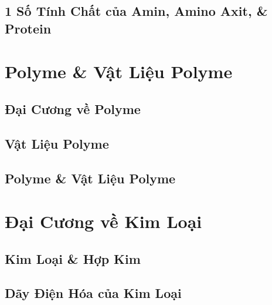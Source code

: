 \documentclass{article}
\numberwithin{equation}{section}
\begin{document}

\subsection{1 Số Tính Chất của Amin, Amino Axit, \& Protein}


\section{Polyme \& Vật Liệu Polyme}

\subsection{Đại Cương về Polyme}


\subsection{Vật Liệu Polyme}


\subsection{Polyme \& Vật Liệu Polyme}


\section{Đại Cương về Kim Loại}

\subsection{Kim Loại \& Hợp Kim}


\subsection{Dãy Điện Hóa của Kim Loại}
\end{document}
